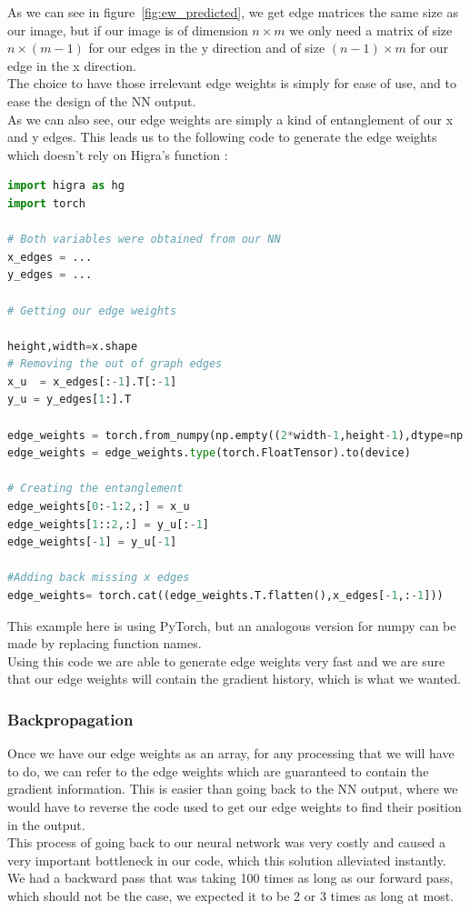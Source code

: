 As we can see in figure~\ref{fig:ew_predicted}, we get edge matrices the same
size as our image, but if our image is of dimension $n\times m$ we only need a
matrix of size $n\times (m-1)$ for our edges in the y direction and of size
$(n-1)\times m$ for our edge in the x direction.\\
The choice to have those irrelevant edge weights is simply for ease of use, and
to ease the design of the NN output.\\

As we can also see, our edge weights are simply a
kind of entanglement of our x and y edges. This leads us to the following code
to generate the edge weights which doesn't rely on Higra's function :
\begin{lstlisting}[language=Python]
import higra as hg
import torch

# Both variables were obtained from our NN
x_edges = ...
y_edges = ...

# Getting our edge weights

height,width=x.shape
# Removing the out of graph edges
x_u  = x_edges[:-1].T[:-1]
y_u = y_edges[1:].T

edge_weights = torch.from_numpy(np.empty((2*width-1,height-1),dtype=np.float64))
edge_weights = edge_weights.type(torch.FloatTensor).to(device)

# Creating the entanglement
edge_weights[0:-1:2,:] = x_u
edge_weights[1::2,:] = y_u[:-1]
edge_weights[-1] = y_u[-1]

#Adding back missing x edges
edge_weights= torch.cat((edge_weights.T.flatten(),x_edges[-1,:-1]))
\end{lstlisting}

This example here is using PyTorch, but an analogous version for numpy can be
made by replacing function names.\\

Using this code we are able to generate edge weights very fast and we are sure
that our edge weights will contain the gradient history, which is what we
wanted.

\subsubsection{Backpropagation}

Once we have our edge weights as an array, for any processing that we will have
to do, we can refer to the edge weights which are guaranteed to contain the
gradient information. This is easier than going back to the NN output, where we
would have to reverse the code used to get our edge weights to find their
position in the output.\\

This process of going back to our neural network was very costly and caused a
very important bottleneck in our code, which this solution alleviated
instantly. We had a backward pass that was taking 100 times as long as our
forward pass, which should not be the case, we expected it to be 2 or 3 times
as long at most.
